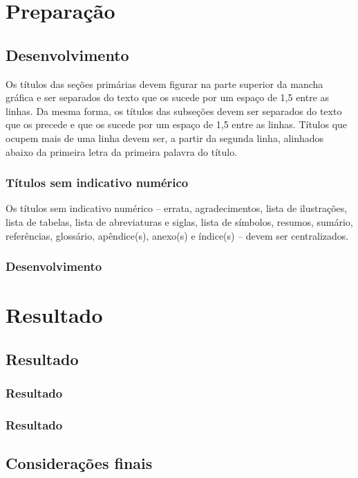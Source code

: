 \documentclass{Arquivos/TrabalhoAcademico}
\begin{document}
\part{Preparação} %

\chapter{Desenvolvimento}
Os títulos das seções primárias devem figurar na parte superior da mancha gráfica e ser separados do
texto que os sucede por um espaço de 1,5 entre as linhas. Da mesma forma, os títulos das subseções
devem ser separados do texto que os precede e que os sucede por um espaço de 1,5 entre as linhas.
Títulos que ocupem mais de uma linha devem ser, a partir da segunda linha, alinhados abaixo da
primeira letra da primeira palavra do título.


\section{Títulos sem indicativo numérico}
Os títulos sem indicativo numérico – errata, agradecimentos, lista de ilustrações, lista de tabelas, lista
de abreviaturas e siglas, lista de símbolos, resumos, sumário, referências, glossário, apêndice(s),
anexo(s) e índice(s) – devem ser centralizados.

\section{Desenvolvimento}
\lipsum[1]


\part{Resultado} %

\chapter{Resultado}
\section{Resultado}
\lipsum[1]
\section{Resultado}
\lipsum[1]

\chapter{Considerações finais}
\end{document}
